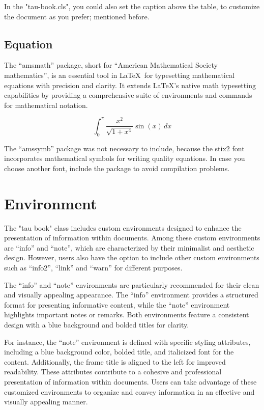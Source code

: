 \documentclass[10pt,a4paper,twoside]{main}
\begin{document}
            In the "tau-book.cls", you could also set the caption above the table, to customize the document as you prefer; mentioned before.

    \subsection{Equation}

        The ``amsmath'' package, short for ``American Mathematical Society mathematics'', is an essential tool in \LaTeX\ for typesetting mathematical equations with precision and clarity. It extends LaTeX's native math typesetting capabilities by providing a comprehensive suite of environments and commands for mathematical notation.

        \begin{equation}
            \int_{0}^{\pi} \frac{x^2}{\sqrt{1 + x^4}} \sin(x) \, dx
        \end{equation}

    \begin{info}
        The ``amssymb'' package was not necessary to include, because the stix2 font incorporates mathematical symbols for writing quality equations. In case you choose another font, include the package to avoid compilation problems.
    \end{info}

    \section{Environment}

        The "tau book" class includes custom environments designed to enhance the presentation of information within documents. Among these custom environments are ``info'' and ``note'', which are characterized by their minimalist and aesthetic design. However, users also have the option to include other custom environments such as ``info2'', ``link'' and ``warn'' for different purposes.

        The ``info'' and ``note'' environments are particularly recommended for their clean and visually appealing appearance. The ``info'' environment provides a structured format for presenting informative content, while the ``note'' environment highlights important notes or remarks. Both environments feature a consistent design with a blue background and bolded titles for clarity.

        For instance, the ``note'' environment is defined with specific styling attributes, including a blue background color, bolded title, and italicized font for the content. Additionally, the frame title is aligned to the left for improved readability. These attributes contribute to a cohesive and professional presentation of information within documents.  Users can take advantage of these customized environments to organize and convey information in an effective and visually appealing manner.
\end{document}
